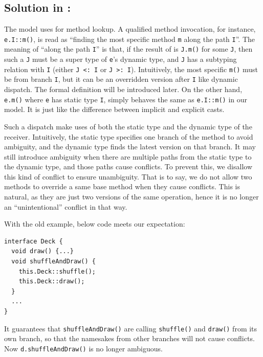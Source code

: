 \subsection{Solution in \MIM: \dispatchnamecaptical}
The \MIM{} model uses \dispatchnameit{} for method lookup. A qualified
method invocation, for instance, \lstinline|e.I::m()|, is read as
``finding the most specific method \lstinline|m| along the path
\lstinline|I|''. The meaning of ``along the path \lstinline|I|'' is
that, if the result of \dispatch{} is \lstinline|J.m()| for some \lstinline|J|, then such a \lstinline|J| must be a super type of \lstinline|e|'s dynamic type, and \lstinline|J| has a subtyping relation with \lstinline|I| (either \lstinline|J <: I| or \lstinline|J >: I|). Intuitively, the most specific \lstinline|m()| must be from branch \lstinline|I|, but it can be an overridden version after \lstinline|I| like dynamic dispatch. The formal definition will be introduced later. On the other hand, \lstinline|e.m()| where \lstinline|e| has static type \lstinline|I|, simply behaves the same as \lstinline|e.I::m()| in our model. It is just like the difference between implicit and explicit casts.

Such a dispatch make uses of both the static type and the dynamic type of the receiver. Intuitively, the static type specifies one branch of the method to avoid ambiguity, and the dynamic type finds the latest version on that branch. It may still introduce ambiguity when there are multiple paths from the static type to the dynamic type, and those paths cause conflicts. To prevent this, we disallow this kind of conflict to ensure unambiguity. That is to say, we do not allow two methods to override a same base method when they cause conflicts. This is natural, as they are just two versions of the same operation, hence it is no longer an ``unintentional'' conflict in that way.

With the old example, below code meets our expectation:
\vspace{3pt}\begin{lstlisting}
interface Deck {
  void draw() {...}
  void shuffleAndDraw() {
    this.Deck::shuffle();
    this.Deck::draw();
  }
  ...
}
\end{lstlisting}\vspace{3pt}
It guarantees that \lstinline|shuffleAndDraw()| are calling \lstinline|shuffle()| and \lstinline|draw()| from its own branch, so that the namesakes
from other branches will not cause conflicts. Now \lstinline|d.shuffleAndDraw()| is no longer ambiguous.


